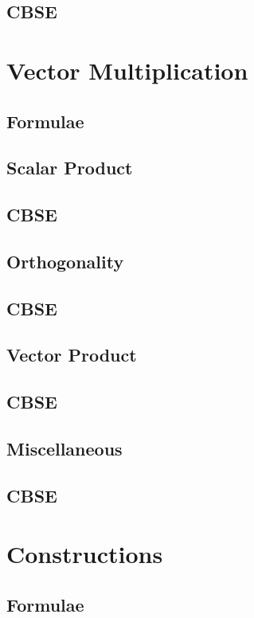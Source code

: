 \documentclass[journal]{IEEEtran}
\begin{document}
\subsection{CBSE}

%
\newpage
\section{Vector Multiplication}
\subsection{Formulae}

\subsection{Scalar Product}

\subsection{CBSE}

\subsection{Orthogonality}

\subsection{CBSE}

\subsection{Vector Product}

\subsection{CBSE}

\subsection{Miscellaneous}

\subsection{CBSE}

\newpage
\section{Constructions}
\subsection{Formulae}

\end{document}
